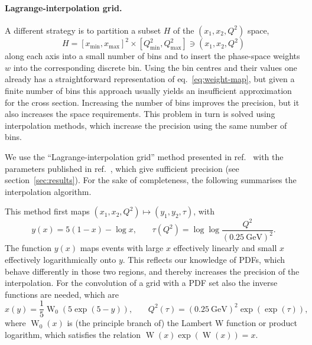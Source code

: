 \paragraph{Lagrange-interpolation grid.}
A different strategy is to partition a subset $H$ of the $(x_1, x_2, Q^2)$ space,
\begin{equation}
H = [x_\mathrm{min},x_\mathrm{max}]^2 \times [Q^2_\mathrm{min}, Q^2_\mathrm{max}] \ni (x_1, x_2, Q^2)
\end{equation}
along each axis into a small number of bins and to insert the phase-space weights $w$ into the corresponding discrete bin.
Using the bin centres and their values one already has a straightforward representation of eq.~\eqref{eq:weight-map}, but given a finite number of bins this approach usually yields an insufficient approximation for the cross section.
Increasing the number of bins improves the precision, but it also increases the space requirements.
This problem in turn is solved using interpolation methods, which increase the precision using the same number of bins.

We use the \enquote{Lagrange-interpolation grid} method presented in ref.~\cite{Carli:2010rw} with the parameters published in ref.~\cite{Bertone:2014zva}, which give sufficient precision (see section~\ref{sec:results}).
For the sake of completeness, the following summarises the interpolation algorithm.

This method first maps $(x_1, x_2, Q^2) \mapsto (y_1, y_2, \tau)$, with
\begin{equation}
y(x) = 5 (1-x) - \log x \text{,} \qquad \tau (Q^2) = \log \log \frac{Q^2}{(\SI{0.25}{\giga\electronvolt})^2} \text{.}
\label{eq:maps}
\end{equation}
The function $y(x)$ maps events with large $x$ effectively linearly and small $x$ effectively logarithmically onto $y$.
This reflects our knowledge of PDFs, which behave differently in those two regions, and thereby increases the precision of the interpolation.
For the convolution of a grid with a PDF set also the inverse functions are needed, which are
\begin{equation}
x(y) = \frac{1}{5} \operatorname{W}_0 (5 \exp (5-y)) \text{,} \qquad Q^2 (\tau) = (\SI{0.25}{\giga\electronvolt})^2 \exp (\exp (\tau)) \text{,}
\end{equation}
where $\operatorname{W}_0 (x)$ is (the principle branch of) the Lambert W function or product logarithm, which satisfies the relation $\operatorname{W} (x) \exp (\operatorname{W} (x)) = x$.

